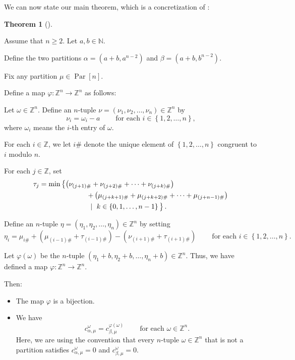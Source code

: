 \documentclass[numbers=enddot,12pt,final,onecolumn,notitlepage]{scrartcl}%
\theoremstyle{definition}
\newtheorem{theo}{Theorem}[section]
\newenvironment{theorem}[1][]
{\begin{theo}[#1]\begin{leftbar}}
{\end{leftbar}\end{theo}}
\begin{document}
We can now state our main theorem, which is a concretization of
\cite[Conjecture 1]{PelRes20}:


\begin{theorem}
\label{thm.main}Assume that $n\geq2$. Let $a,b\in\mathbb{N}$.

Define the two partitions $\alpha=\left(  a+b,a^{n-2}\right)  $ and
$\beta=\left(  a+b,b^{n-2}\right)  $.

Fix any partition $\mu\in\operatorname*{Par}\left[  n\right]  $.

Define a map $\varphi:\mathbb{Z}^{n}\rightarrow\mathbb{Z}^{n}$ as follows:

Let $\omega\in\mathbb{Z}^{n}$. Define an $n$-tuple $\nu=\left(  \nu_{1}%
,\nu_{2},\ldots,\nu_{n}\right)  \in\mathbb{Z}^{n}$ by
\[
\nu_{i}=\omega_{i}-a\ \ \ \ \ \ \ \ \ \ \text{for each }i\in\left\{
1,2,\ldots,n\right\}  ,
\]
where $\omega_{i}$ means the $i$-th entry of $\omega$.

For each $i\in\mathbb{Z}$, we let $i\#$ denote the unique element of $\left\{
1,2,\ldots,n\right\}  $ congruent to $i$ modulo $n$.

For each $j\in\mathbb{Z}$, set%
\begin{align*}
\tau_{j}  &  =\min\left\{  \left(  \nu_{\left(  j+1\right)  \#}+\nu_{\left(
j+2\right)  \#}+\cdots+\nu_{\left(  j+k\right)  \#}\right)  \right. \\
&  \ \ \ \ \ \ \ \ \ \ \ \ \ \ \ \ \ \ \ \ \left.  +\left(  \mu_{\left(
j+k+1\right)  \#}+\mu_{\left(  j+k+2\right)  \#}+\cdots+\mu_{\left(
j+n-1\right)  \#}\right)  \right. \\
&  \ \ \ \ \ \ \ \ \ \ \ \ \ \ \ \ \ \ \ \ \left.  \ \mid\ k\in\left\{
0,1,\ldots,n-1\right\}
\vphantom{\left(\nu_{\left(j+1\right)\#}\right)}\right\}  .
\end{align*}


Define an $n$-tuple $\eta=\left(  \eta_{1},\eta_{2},\ldots,\eta_{n}\right)
\in\mathbb{Z}^{n}$ by setting%
\[
\eta_{i}=\mu_{i\#}+\left(  \mu_{\left(  i-1\right)  \#}+\tau_{\left(
i-1\right)  \#}\right)  -\left(  \nu_{\left(  i+1\right)  \#}+\tau_{\left(
i+1\right)  \#}\right)  \ \ \ \ \ \ \ \ \ \ \text{for each }i\in\left\{
1,2,\ldots,n\right\}  .
\]


Let $\varphi\left(  \omega\right)  $ be the $n$-tuple $\left(  \eta_{1}%
+b,\eta_{2}+b,\ldots,\eta_{n}+b\right)  \in\mathbb{Z}^{n}$. Thus, we have
defined a map $\varphi:\mathbb{Z}^{n}\rightarrow\mathbb{Z}^{n}$.

Then:

\begin{itemize}
\item[\textbf{(a)}] The map $\varphi$ is a bijection.

\item[\textbf{(b)}] We have%
\[
c_{\alpha,\mu}^{\omega}=c_{\beta,\mu}^{\varphi\left(  \omega\right)
}\ \ \ \ \ \ \ \ \ \ \text{for each }\omega\in\mathbb{Z}^{n}.
\]
Here, we are using the convention that every $n$-tuple $\omega\in
\mathbb{Z}^{n}$ that is not a partition satisfies $c_{\alpha,\mu}^{\omega}=0$
and $c_{\beta,\mu}^{\omega}=0$.
\end{itemize}
\end{theorem}
\end{document}
